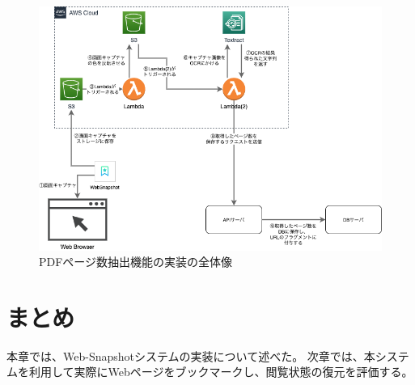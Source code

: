 \begin{figure}[htbp]
  \caption{PDFページ数抽出機能の実装の全体像}
  \label{fig:impl-pdf-overall}
  \begin{center}
    \includegraphics[bb=0 0 734 522,width=15cm]{img/050_implementation/server/impl-pdf-overall.pdf}
  \end{center}
\end{figure}

\section{まとめ}
本章では、Web-Snapshotシステムの実装について述べた。
次章では、本システムを利用して実際にWebページをブックマークし、閲覧状態の復元を評価する。